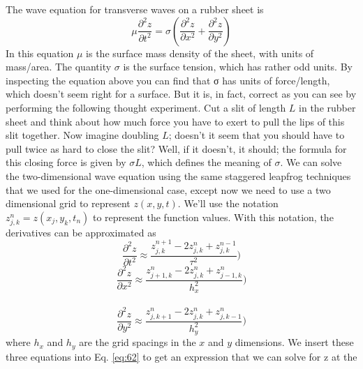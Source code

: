 The wave equation for transverse waves on a rubber sheet is
\begin{equation}\label{eq:62}
\mu \frac{\partial^2 z}{\partial t^2} = \sigma (\frac{\partial^2 z}{\partial x^2} + \frac{\partial^2 z}{\partial y^2} )
\end{equation}
In this equation $\mu$ is the surface mass density of the sheet, with units of mass/area.
The quantity $\sigma$ is the surface tension, which has rather odd units. By inspecting
the equation above you can find that σ has units of force/length, which doesn\rq t
seem right for a surface. But it is, in fact, correct as you can see by performing the
following thought experiment. Cut a slit of length $L$ in the rubber sheet and think
about how much force you have to exert to pull the lips of this slit together. Now
imagine doubling $L$; doesn\rq t it seem that you should have to pull twice as hard to close the slit? Well, if it doesn\rq t, it should; the formula for this closing force is
given by $\sigma L$, which defines the meaning of $\sigma$.
We can solve the two-dimensional wave equation using the same staggered
leapfrog techniques that we used for the one-dimensional case, except now we
need to use a two dimensional grid to represent $z(x, y,t)$. We\rq ll use the notation $ z^n_{j,k} = z(x_j,y_k,t_n) $ to represent the function values. With this notation, the
derivatives can be approximated as
\begin{equation}\label{eq:63}
\frac{\partial^2 z}{\partial t^2} \approx \frac{z^{n+1}_{j,k}-2z^n_{j,k}+z^{n-1}_{j,k}}{\tau^2} )
\end{equation}
\begin{equation}\label{eq:64}
\frac{\partial^2 z}{\partial x^2} \approx \frac{z^{n}_{j+1,k}-2z^n_{j,k}+z^{n}_{j-1,k}}{h^2_x} )
\end{equation}\\
\begin{equation}\label{eq:65}
\frac{\partial^2 z}{\partial y^2} \approx \frac{z^{n}_{j,k+1}-2z^n_{j,k}+z^{n}_{j,k-1}}{h^2_y} )
\end{equation}
where $h_x$ and $h_y$ are the grid spacings in the $x$ and $y$ dimensions. We insert these
three equations into Eq. \eqref{eq:62} to get an expression that we can solve for z at the
